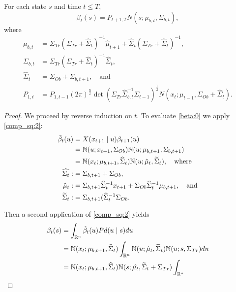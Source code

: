\documentclass[12pt,leqno]{article}
\begin{document}
\begin{Thm}\label{beta:1}
  For each state $s$ and time $t \le T$,
$$
  \beta_t(s) = P_{t+1,T}N(s;\mu_{b,t},\Sigma_{b,t}),
$$
where
\begin{align*}
  \mu_{b,t} &= \Sigma_{Tr}(\Sigma_{Tr}+\widehat{\Sigma}_t)^{-1}\hat{\mu}_{t+1}
  + \widehat{\Sigma}_t(\Sigma_{Tr}+\widehat{\Sigma}_t)^{-1}, \\
  \Sigma_{b,t} &= \Sigma_{Tr}(\Sigma_{Tr}+\widehat{\Sigma}_t)^{-1}\widehat{\Sigma}_t,\\
  \widehat{\Sigma}_t &= \Sigma_{Ob}+\Sigma_{b,t+1},
 \quad\text{and}\\
  P_{1,t} &=P_{1,t-1}(2\pi)^{\frac{n}{2}}\det(\Sigma_{Tr}\widehat{\Sigma}_{b,t}^{-1}\Sigma_{t-1})^{\frac{1}{2}}
  N(x_t;\mu_{t-1},\Sigma_{Ob} + \widehat{\Sigma}_t).
\end{align*}
\end{Thm}

\begin{proof}
  We proceed by reverse induction on $t$.  To evaluate \eqref{beta:0} we apply \eqref{comp_sq:2}:
  \begin{align*}
    \hat{\beta}_t(u) &= X(x_{t+1}\mid u)\beta_{t+1}(u)\\
    &= {\mathbb N}(u;x_{t+1},\Sigma_{Ob}){\mathbb N}(u;\mu_{b,t+1},\Sigma_{b,t+1})\\
    &= {\mathbb N}(x_t;\mu_{b,t+1},\widehat{\Sigma}_t){\mathbb N}(u;\hat{\mu}_t,\widetilde{\Sigma}_t),\quad\text{where}\\
    \widehat{\Sigma_t} :&= \Sigma_{b,t+1}+\Sigma_{Ob},\\
    \hat{\mu}_t :&= \Sigma_{b,t+1}\widehat{\Sigma}_t^{-1}x_{t+1} + \Sigma_{Ob}\widehat{\Sigma}_t^{-1}\mu_{b,t+1},\quad\text{and}\\    \widetilde{\Sigma}_t :&= \Sigma_{b,t+1}(\widehat{\Sigma}_t^{-1}\Sigma_{Ob}.
  \end{align*}

  Then a second application of \eqref{comp_sq:2} yields
  \begin{align*}
    \beta_t(s) &= \int_{{\mathbb R}^n}\hat{\beta}_t(u)Pd(u\mid s)du \\
    &= {\mathbb N}(x_t;\mu_{b,t+1},\widehat{\Sigma}_t)\int_{{\mathbb R}^n}{\mathbb N}(u;\hat{\mu}_t,\widetilde{\Sigma}_t){\mathbb N}(u;s,\Sigma_{Tr})du\\
    &={\mathbb N}(x_t;\mu_{b,t+1},\widehat{\Sigma}_t){\mathbb N}(s;\hat{\mu_t},\widetilde{\Sigma}_t+\Sigma_{Tr})\int_{{\mathbb R}^n}
  \end{align*}
\end{proof}
\end{document}
